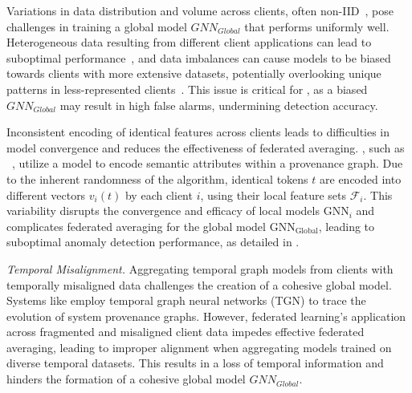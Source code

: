 \begin{enumerate}[itemsep=0.1em, parsep=0em, topsep=0em, leftmargin=*]
   Variations in data distribution and volume across clients, often non-IID~\cite{zhao2018federated}, pose challenges in training a global model \( GNN_{Global} \) that performs uniformly well. Heterogeneous data resulting from different client applications can lead to suboptimal performance~\cite{qu2022rethinking}, and data imbalances can cause models to be biased towards clients with more extensive datasets, potentially overlooking unique patterns in less-represented clients~\cite{duan2020self}. This issue is critical for \pids, as a biased \( GNN_{Global} \) may result in high false alarms, undermining detection accuracy.

   Inconsistent encoding of identical features across clients leads to difficulties in model convergence and reduces the effectiveness of federated averaging. \pids, such as \flash~\cite{cheng2023kairos}, utilize a \wordvec model to encode semantic attributes within a provenance graph. Due to the inherent randomness of the \wordvec algorithm, identical tokens \( t \) are encoded into different vectors \( v_i(t) \) by each client \( i \), using their local feature sets \( \mathcal{F}_i \). This variability disrupts the convergence and efficacy of local \gnn models \( \text{GNN}_{i} \) and complicates federated averaging for the global \gnn model \( \text{GNN}_{\text{Global}} \), leading to suboptimal anomaly detection performance, as detailed in \cite{zhou2023fedfa}.

   {\it Temporal Misalignment.} Aggregating temporal graph models from clients with temporally misaligned data challenges the creation of a cohesive global model. Systems like \kairos \cite{cheng2023kairos} employ temporal graph neural networks (TGN) to trace the evolution of system provenance graphs. However, federated learning's application across fragmented and misaligned client data impedes effective federated averaging, leading to improper alignment when aggregating models trained on diverse temporal datasets. This results in a loss of temporal information and hinders the formation of a cohesive global model \( GNN_{Global} \).
  
\end{enumerate}

